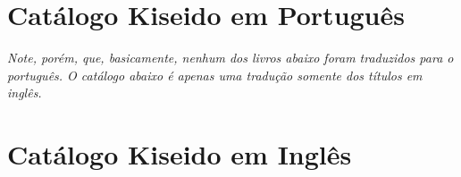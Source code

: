 \chapter{Catálogo Kiseido em Português}\label{ap:pt}

\emph{Note, porém, que, basicamente, nenhum dos livros abaixo foram traduzidos para o português. O catálogo abaixo é apenas uma tradução somente dos títulos em inglês.}

\bigskip

\chapter{Catálogo Kiseido em Inglês}\label{ap:en}